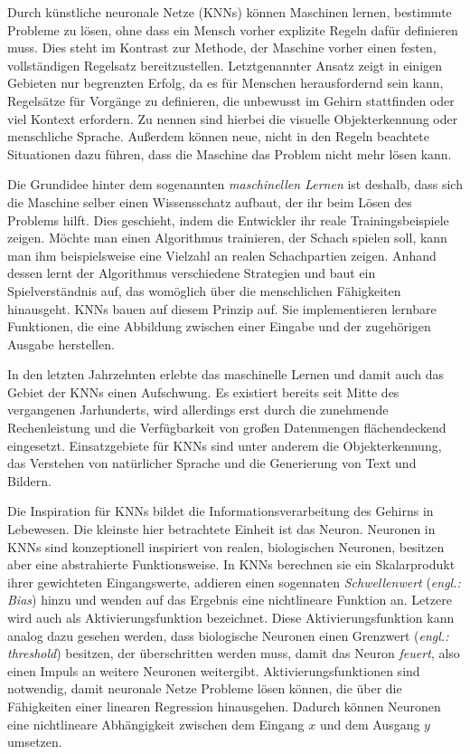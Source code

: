 \label{chap:KNNs}
Durch künstliche neuronale Netze (\acsp{KNN}) können Maschinen lernen, bestimmte Probleme zu lösen, ohne dass ein Mensch vorher explizite Regeln dafür definieren muss. Dies steht im Kontrast zur Methode, der Maschine  vorher einen festen, vollständigen Regelsatz bereitzustellen. Letztgenannter Ansatz zeigt in einigen Gebieten nur begrenzten Erfolg, da es für Menschen herausfordernd sein kann, Regelsätze für Vorgänge zu definieren, die unbewusst im Gehirn stattfinden oder viel Kontext erfordern. Zu nennen sind hierbei die visuelle Objekterkennung oder menschliche Sprache. Außerdem können neue, nicht in den Regeln beachtete Situationen dazu führen, dass die Maschine das Problem nicht mehr lösen kann. \cite{DeepLearningBook}

Die Grundidee hinter dem sogenannten \emph{maschinellen Lernen} ist deshalb, dass sich die Maschine selber einen Wissensschatz aufbaut, der ihr beim Lösen des Problems hilft. Dies geschieht, indem die Entwickler ihr reale Trainingsbeispiele zeigen. Möchte man einen Algorithmus trainieren, der Schach spielen soll, kann man ihm beispielsweise eine Vielzahl an realen Schachpartien zeigen. Anhand dessen lernt der Algorithmus verschiedene Strategien und baut ein Spielverständnis auf, das womöglich über die menschlichen Fähigkeiten hinausgeht. \acp{KNN} bauen auf diesem Prinzip auf. Sie implementieren lernbare Funktionen, die eine Abbildung zwischen einer Eingabe und der zugehörigen Ausgabe herstellen. \cite{DeepLearningBook}

In den letzten Jahrzehnten erlebte das maschinelle Lernen und damit auch das Gebiet der \acp{KNN} einen Aufschwung. Es existiert bereits seit Mitte des vergangenen Jarhunderts, wird allerdings erst durch die zunehmende Rechenleistung und die Verfügbarkeit von großen Datenmengen flächendeckend eingesetzt. Einsatzgebiete für \acp{KNN} sind unter anderem die Objekterkennung, das Verstehen von natürlicher Sprache und die Generierung von Text und Bildern. \cite{knnsKompakt}

Die Inspiration für \acp{KNN} bildet die Informationsverarbeitung des Gehirns in Lebewesen. Die kleinste hier betrachtete Einheit ist das Neuron. Neuronen in \acp{KNN} sind konzeptionell inspiriert von realen, biologischen Neuronen, besitzen aber eine abstrahierte Funktionsweise. In \acp{KNN} berechnen sie ein Skalarprodukt ihrer gewichteten Eingangswerte, addieren einen sogennaten \emph{Schwellenwert} (\emph{engl.: Bias}) hinzu und wenden auf das Ergebnis eine nichtlineare Funktion an. Letzere wird auch als Aktivierungsfunktion bezeichnet. 
Diese Aktivierungsfunktion kann analog dazu gesehen werden, dass biologische Neuronen einen Grenzwert (\emph{engl.: threshold}) besitzen, der überschritten werden muss, damit das Neuron \emph{feuert}, also einen Impuls an weitere Neuronen weitergibt. Aktivierungsfunktionen sind notwendig, damit neuronale Netze Probleme lösen können, die über die Fähigkeiten einer linearen Regression hinausgehen. Dadurch können Neuronen eine nichtlineare Abhängigkeit zwischen dem Eingang $x$ und dem Ausgang $y$ umsetzen. \cite{visualApproach}

